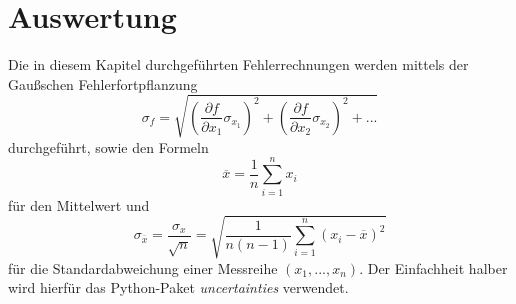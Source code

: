 \section{Auswertung}
\label{sec:Auswertung}

Die in diesem Kapitel durchgeführten Fehlerrechnungen werden mittels der Gaußschen Fehlerfortpflanzung 
\begin{equation}
    \sigma_f = \sqrt{\left( \frac{\partial f}{\partial x_1} \sigma_{x_1} \right)^2 + \left( \frac{\partial f}{\partial x_2} \sigma_{x_2} \right)^2 + ...}
\end{equation}
durchgeführt, sowie den Formeln 
\begin{equation}
    \overline{x} = \frac{1}{n} \sum^n_{i=1}x_i 
    \label{eq:mittelwert}
\end{equation}
für den Mittelwert und 
\begin{equation}
    \sigma_{\overline{x}} = \frac{\sigma_x}{\sqrt{n}} = \sqrt{\frac{1}{n(n-1)}  \sum^n_{i=1} \left( x_i - \overline{x}\right)^2 } 
    \label{eq:abweichung}
\end{equation}
für die Standardabweichung einer Messreihe $\left( x_1, ... , x_n  \right)$.
Der Einfachheit halber wird hierfür das Python-Paket \textit{uncertainties} verwendet. \cite{uncertainties} \\
\hspace{1cm}

